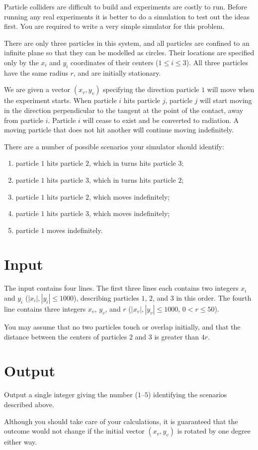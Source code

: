 
Particle colliders are difficult to build and experiments are costly
to run.  Before running any real experiments it is better to do a
simulation to test out the ideas first.  You are required to write a
very simple simulator for this problem.

There are only three particles in this system, and all particles are
confined to an infinite plane so that they can be modelled as circles.
Their locations are specified only by the $x_i$ and $y_i$ coordinates
of their centers ($1 \leq i \leq 3$).  All three particles have the
same radius $r$, and are initially stationary.

We are given a vector $(x_v, y_v)$ specifying the direction particle
$1$ will move when the experiment starts.  When particle $i$ hits
particle $j$, particle $j$ will start moving in the direction
perpendicular to the tangent at the point of the contact, away from
particle $i$.  Particle $i$ will cease to exist and be converted to
radiation.  A moving particle that does not hit another will continue
moving indefinitely.

There are a number of possible scenarios your simulator should identify:
\begin{enumerate}
\item particle $1$ hits particle $2$, which in turns hits particle $3$;
\item particle $1$ hits particle $3$, which in turns hits particle $2$;
\item particle $1$ hits particle $2$, which moves indefinitely;
\item particle $1$ hits particle $3$, which moves indefinitely;
\item particle $1$ moves indefinitely.
\end{enumerate}

\section*{Input} 

The input contains four lines.  The first three lines each contains 
two integers $x_i$ and $y_i$ ($|x_i|,|y_i| \leq 1000$), describing 
particles $1$, $2$, and $3$ in this order.  The fourth line contains three 
integers $x_v$, $y_v$, and $r$ ($|x_v|, |y_v| \leq 1000$, $0 < r \leq 50$).

You may assume that no two particles touch or overlap initially, and that
the distance between the centers of particles $2$ and $3$ 
is greater than $4r$.

\section*{Output}
Output a single integer giving the number ($1$--$5$) identifying the
scenarios described above.

Although you should take care of your calculations, it is guaranteed that the
outcome would not change if the initial vector $(x_v,y_v)$ is rotated by one
degree either way.
